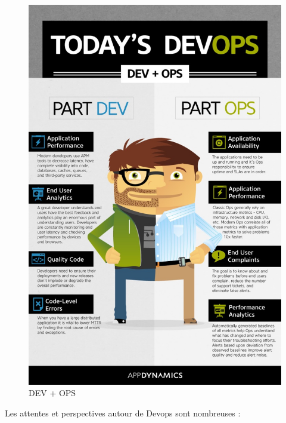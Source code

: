 \documentclass{report}
\begin{document}
  \begin{figure}
    \begin{center}
      \includegraphics[scale=1.5]{images/devops.png}
    \end{center}
    \caption{DEV + OPS}
    \label{Devops}
  \end{figure}

  Les attentes et perspectives autour de Devops sont nombreuses :\\
\end{document}
